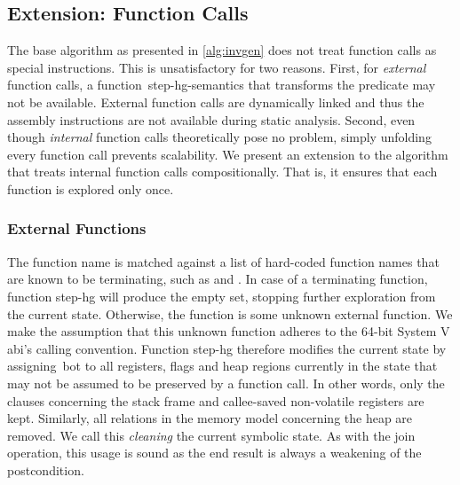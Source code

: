 \subsection{Extension: Function Calls}\label{subsec:function_calls}
The base algorithm as presented in \cref{alg:invgen} does not treat function calls as special instructions.
This is unsatisfactory for two reasons.
First, for \emph{external} function calls, a function~\gls{step-hg-semantics} that transforms the predicate may not be available.
External function calls are dynamically linked and thus the assembly instructions are not available during static analysis.
Second, even though \emph{internal} function calls theoretically pose no problem, simply unfolding every function call prevents scalability.
We present an extension to the algorithm that treats internal function calls compositionally. That is, it ensures that each function is explored only once.

\subsubsection{External Functions}


The function name is matched against a list of hard-coded function names that are known to be terminating, such as  and .
In case of a terminating function, function \gls{step-hg} will produce the empty set, stopping further exploration from the current state.
Otherwise, the function is some unknown external function.
We make the assumption that this unknown function adheres to the 64-bit System V \ac{abi}'s calling convention.
Function \gls{step-hg} therefore modifies the current state by assigning~\gls{bot} to all registers, flags and heap regions currently in the state that may not be assumed to be preserved by a function call.
In other words, only the clauses concerning the stack frame and callee-saved non-volatile registers are kept.
Similarly, all relations in the memory model concerning the heap are removed.
We call this \emph{cleaning} the current symbolic state.
As with the join operation, this usage is sound as the end result is always a weakening of the postcondition.

